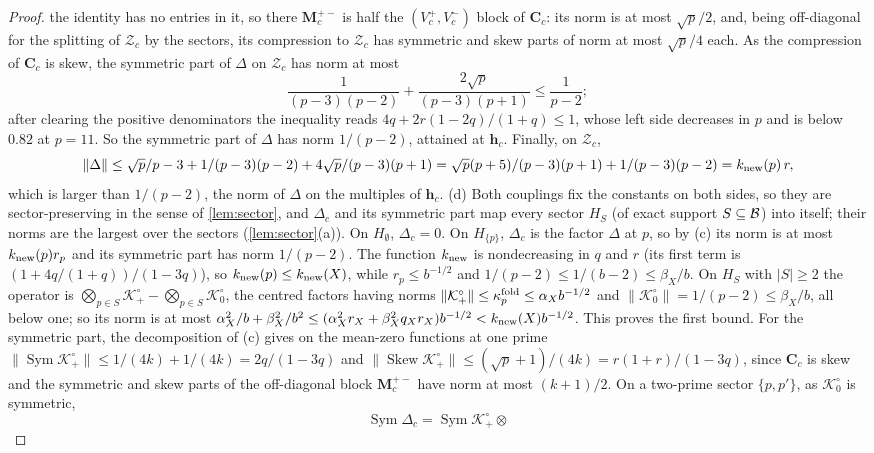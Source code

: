 \begin{proof}
the identity has no entries in it, so there $\mathbf M_c^{+-}$ is half the
$(V_c^+,V_c^-)$ block of $\mathbf C_c$: its norm is at most $\sqrt p/2$, and,
being off-diagonal for the splitting of $\mathcal Z_c$ by the sectors, its
compression to $\mathcal Z_c$ has symmetric and skew parts of norm at most
$\sqrt p/4$ each. As the compression of $\mathbf C_c$ is skew, the symmetric
part of $\Delta$ on $\mathcal Z_c$ has norm at most
\[
 \frac1{(p-3)(p-2)}+\frac{2\sqrt p}{(p-3)(p+1)}\le\frac1{p-2};
\]
after clearing the positive denominators the inequality reads
$4q+2r(1-2q)/(1+q)\le1$, whose left side decreases in $p$ and is below
$0.82$ at $p=11$. So the symmetric part of $\Delta$ has norm $1/(p-2)$,
attained at $\mathbf h_c$. Finally, on $\mathcal Z_c$,
\[
 \|\Delta\|\le\frac{\sqrt p}{p-3}+\frac1{(p-3)(p-2)}+\frac{4\sqrt p}{(p-3)(p+1)}
 =\frac{\sqrt p(p+5)}{(p-3)(p+1)}+\frac1{(p-3)(p-2)}=k_{\rm new}(p)\,r,
\]
which is larger than $1/(p-2)$, the norm of $\Delta$ on the multiples of
$\mathbf h_c$.
(d) Both couplings fix the constants on both sides, so they are
sector-preserving in the sense of \cref{lem:sector}, and $\Delta_c$ and its
symmetric part map every sector $H_S$ (of exact support $S\subseteq\Blk$)
into itself; their norms are the largest over the sectors
(\cref{lem:sector}(a)). On $H_\emptyset$, $\Delta_c=0$. On $H_{\{p\}}$,
$\Delta_c$ is the factor $\Delta$ at $p$, so by (c) its norm is at most
$k_{\rm new}(p)r_p$ and its symmetric part has norm $1/(p-2)$. The function
$k_{\rm new}$ is nondecreasing in $q$ and $r$ (its first term is
$(1+4q/(1+q))/(1-3q)$), so $k_{\rm new}(p)\le k_{\rm new}(X)$, while
$r_p\le b^{-1/2}$ and $1/(p-2)\le1/(b-2)\le\beta_X/b$. On $H_S$ with
$|S|\ge2$ the operator is
$\bigotimes_{p\in S}\mathcal K_+^\circ-\bigotimes_{p\in S}\mathcal K_0^\circ$,
the centred factors having norms $\|\mathcal K_+^\circ\|\le\kappa^{\rm fold}_p
\le\alpha_Xb^{-1/2}$ and $\|\mathcal K_0^\circ\|=1/(p-2)\le\beta_X/b$, all
below one; so its norm is at most
$\alpha_X^2/b+\beta_X^2/b^2\le(\alpha_X^2r_X+\beta_X^2q_Xr_X)b^{-1/2}
<k_{\rm new}(X)b^{-1/2}$. This proves the first bound. For the symmetric
part, the decomposition of (c) gives on the mean-zero functions at one prime
$\|\operatorname{Sym}\mathcal K_+^\circ\|\le1/(4k)+1/(4k)=2q/(1-3q)$ and
$\|\operatorname{Skew}\mathcal K_+^\circ\|\le(\sqrt p+1)/(4k)=r(1+r)/(1-3q)$,
since $\mathbf C_c$ is skew and the symmetric and skew parts of the
off-diagonal block $\mathbf M_c^{+-}$ have norm at most $(k+1)/2$. On a
two-prime sector $\{p,p'\}$, as $\mathcal K_0^\circ$ is symmetric,
\[
 \operatorname{Sym}\Delta_c=\operatorname{Sym}\mathcal K_+^\circ\otimes
\]
\end{proof}

